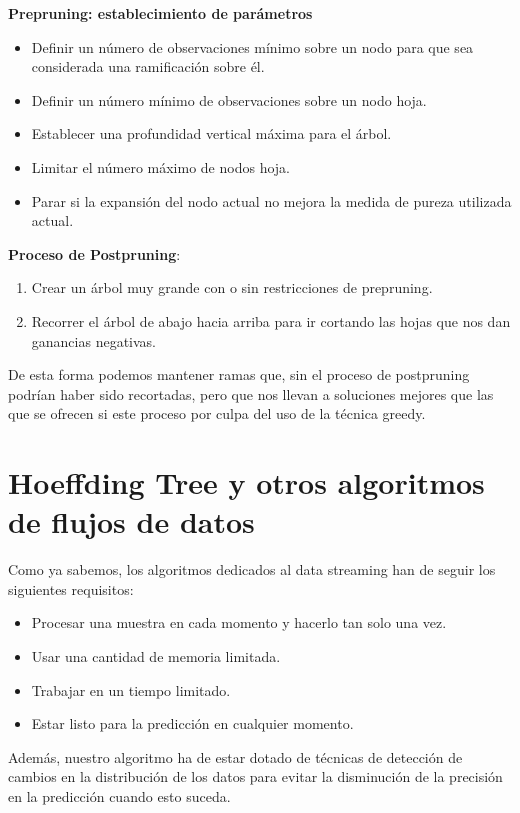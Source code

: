 \textbf{Prepruning: establecimiento de parámetros}
\begin{itemize}
	\item Definir un número de observaciones mínimo sobre un nodo para que sea considerada una ramificación sobre él.
	\item Definir un número mínimo de observaciones sobre un nodo hoja.
	\item Establecer una profundidad vertical máxima para el árbol.
	\item Limitar el número máximo de nodos hoja.
	\item Parar si la expansión del nodo actual no mejora la medida de pureza utilizada actual.
\end{itemize}

\textbf{Proceso de Postpruning}:
\begin{enumerate}
	\item Crear un árbol muy grande con o sin restricciones de prepruning.
	\item Recorrer el árbol de abajo hacia arriba para ir cortando las hojas que nos dan ganancias negativas.
\end{enumerate}

De esta forma podemos mantener ramas que, sin el proceso de postpruning podrían haber sido recortadas, pero que nos llevan a soluciones mejores que las que se ofrecen si este proceso por culpa del uso de la técnica greedy.


\section{Hoeffding Tree y otros algoritmos de flujos de datos}

Como ya sabemos, los algoritmos dedicados al data streaming han de seguir los siguientes requisitos:
\begin{itemize}
	\item Procesar una muestra en cada momento y hacerlo tan solo una vez.
	\item Usar una cantidad de memoria limitada.
	\item Trabajar en un tiempo limitado.
	\item Estar listo para la predicción en cualquier momento.
\end{itemize}

Además, nuestro algoritmo ha de estar dotado de técnicas de detección de cambios en la distribución de los datos para evitar la disminución de la precisión en la predicción cuando esto suceda.

